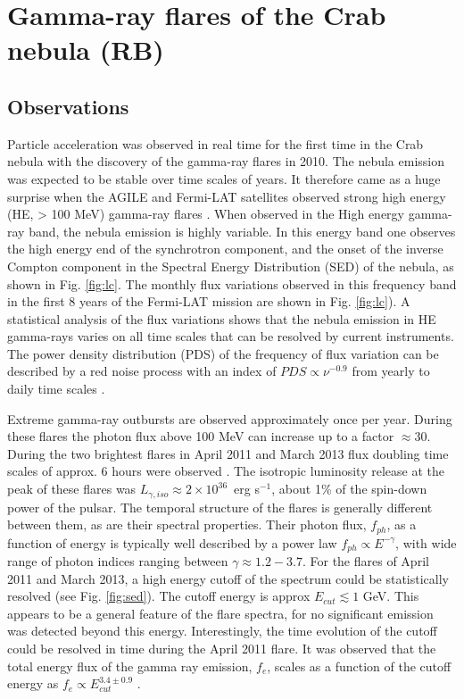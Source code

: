 \section{Gamma-ray flares of the Crab nebula (RB)}
\label{sec:flares}

\subsection{Observations}

Particle acceleration was observed in real time for the first time in the Crab nebula with the discovery of the gamma-ray flares in 2010.  The nebula emission was expected to  be stable over time scales of years. It therefore came as a huge surprise when the AGILE and Fermi-LAT satellites observed strong high energy (HE, > 100 MeV) gamma-ray flares \citep{Tavani2011,Abdo2011}. When observed in the High energy  gamma-ray band, the nebula emission is highly variable. In this energy band one observes the high energy end of the synchrotron component, and the onset of the inverse Compton component in the Spectral Energy Distribution (SED) of the nebula, as shown in Fig. \ref{fig:lc}. The monthly flux variations observed in this frequency band in the first 8 years of the Fermi-LAT mission are shown in Fig. \ref{fig:lc}). A statistical analysis of the flux variations shows that the nebula emission in HE gamma-rays varies on all time scales that can be resolved by current instruments. The power density distribution (PDS) of the frequency of flux variation can be described by a red noise process with an index of $PDS \propto \nu^{-0.9}$  from yearly to daily time scales \citep{buehler2012}.

Extreme gamma-ray outbursts are observed approximately once per year. During these flares the photon flux above 100 MeV can increase up to a factor $\approx 30$. During the two brightest flares in April 2011 and March 2013 flux doubling time scales of approx. 6 hours were observed \citep{buehler2012,Mayer2013}. The isotropic luminosity release at the peak of these flares was $L_{\gamma, iso} \approx 2 \times 10^{36}$~erg s$^{-1}$, about 1\% of the spin-down power of the pulsar. The temporal structure of the flares is generally different between them, as are their spectral properties. Their photon flux, $f_{ph}$,  as a function of energy is typically well described by a power law $f_{ph} \propto E^{-\gamma}$, with  wide range of photon indices ranging between  $\gamma \approx 1.2 - 3.7$. For the flares of April 2011 and March 2013, a high energy cutoff of the spectrum could be statistically resolved (see Fig. \ref{fig:sed}). The cutoff energy is approx $E_{cut} \lesssim 1$ GeV. This appears to be a general feature of the flare spectra, for no significant emission was detected beyond this energy. Interestingly, the time evolution of the cutoff could be resolved in time during the April 2011 flare. It was observed that the total energy flux of the gamma ray emission, $f_e$,  scales as a function of the cutoff energy as $f_e \propto E_{cut}^{3.4 \pm 0.9}$  \citep{buehler2012}.

